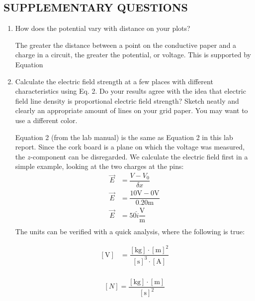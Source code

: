 \documentclass [12pt, letterpaper, twoside] {article}
\begin{document}
\subsection* {SUPPLEMENTARY QUESTIONS}
\begin{enumerate}
  \item How does the potential vary with distance on your plots?

The greater the distance between a point on the conductive paper and a charge in a circuit, the greater the potential, or voltage. This is supported by Equation 
  \item Calculate the electric field strength at a few places with different characteristics using Eq. 2. Do your results agree with the idea that electric field line density is proportional electric field strength? Sketch neatly and clearly an appropriate amount of lines on your grid paper. You may want to use a different color.

Equation 2 (from the lab manual) \cite{labManual} is the same as Equation 2 in this lab report. Since the cork board is a plane on which the voltage was measured, the \(z\)-component can be disregarded. We calculate the electric field first in a simple example, looking at the two charges at the pins:
\begin{equation*}
  \begin{split}
    \vec{E} &= \dfrac{V-V_{0}}{\delta{x}} \\
    \vec{E} &= \dfrac{10\text{V}-0\text{V}}{0.20\text{m}} \\
    \vec{E} &= 50\hat{i}\dfrac{\text{V}}{\text{m}} \\
  \end{split}
\end{equation*}
The units can be verified with a quick analysis, where the following is true:

\begin{equation}
  \begin{split} 
    [\text{V}] &= \dfrac{[\text{kg}]\cdot{[\text{m}]^2}}{[\text{s}]^3\cdot{[\text{A}]}} \\
  \end{split}
\end{equation}

\begin{equation}
  \begin{split}
    [N] = \dfrac{[\text{kg}]\cdot{[\text{m}]}}{[\text{s}]^2}\\
  \end{split}
\end{equation}


\end{enumerate}
\end{document}
